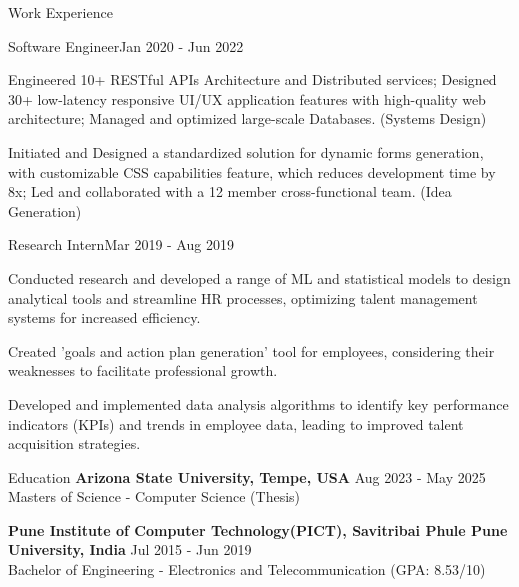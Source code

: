 \documentclass{resume} %
\begin{document}
    \begin{rSection}{Work Experience}
                    \begin{rSubsection}
                {Software Engineer}{Jan 2020 - Jun 2022}
                                    {}
                                {}
                                    \item Engineered 10+ RESTful APIs Architecture and Distributed services; Designed 30+ low{-}latency responsive UI/UX application features with high{-}quality web architecture; Managed and optimized large{-}scale Databases. (Systems Design)
                                    \item Initiated and Designed a standardized solution for dynamic forms generation, with customizable CSS capabilities feature, which reduces development time by 8x; Led and collaborated with a 12 member cross{-}functional team. (Idea Generation)
                            \end{rSubsection}
                    \begin{rSubsection}
                {Research Intern}{Mar 2019 - Aug 2019}
                                    {}
                                {}
                                    \item Conducted research and developed a range of ML and statistical models to design analytical tools and streamline HR processes, optimizing talent management systems for increased efficiency.
                                    \item Created 'goals and action plan generation' tool for employees, considering their weaknesses to facilitate professional growth.
                                    \item Developed and implemented data analysis algorithms to identify key performance indicators (KPIs) and trends in employee data, leading to improved talent acquisition strategies.
                            \end{rSubsection}
            \end{rSection}

\begin{rSection}{Education}
                        \textbf{Arizona State University, Tempe, USA} \hfill {Aug 2023 - May 2025} \\
                            {Masters of Science {-} Computer Science (Thesis)}
                         
             
         
                        \textbf{Pune Institute of Computer Technology(PICT), Savitribai Phule Pune University, India} \hfill {Jul 2015 - Jun 2019} \\
                            {Bachelor of Engineering {-} Electronics and Telecommunication}
                                        \hfill {(GPA: 8.53/10)}
             
             
         
    \end{rSection}
\end{document}
